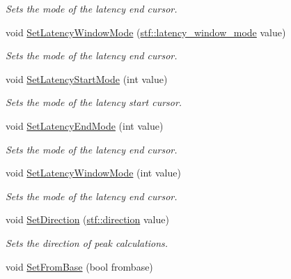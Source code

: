 \begin{DoxyCompactItemize}
\begin{DoxyCompactList}\small\item\em Sets the mode of the latency end cursor. \item\end{DoxyCompactList}\item 
void \hyperlink{classRecording_ae7e27b35fdfe3d0c1333c9b27c50dc8a}{SetLatencyWindowMode} (\hyperlink{group__stfgen_gae034ed0eec6bdaba3b23d3b2184f799d}{stf::latency\_\-window\_\-mode} value)
\begin{DoxyCompactList}\small\item\em Sets the mode of the latency end cursor. \item\end{DoxyCompactList}\item 
void \hyperlink{classRecording_a51fb88318701fd397e8807843fdbef12}{SetLatencyStartMode} (int value)
\begin{DoxyCompactList}\small\item\em Sets the mode of the latency start cursor. \item\end{DoxyCompactList}\item 
void \hyperlink{classRecording_a3c3da2d19c49168626092dadb502eef1}{SetLatencyEndMode} (int value)
\begin{DoxyCompactList}\small\item\em Sets the mode of the latency end cursor. \item\end{DoxyCompactList}\item 
void \hyperlink{classRecording_ab8e835076a514e7bcf572e2f3e1a6163}{SetLatencyWindowMode} (int value)
\begin{DoxyCompactList}\small\item\em Sets the mode of the latency end cursor. \item\end{DoxyCompactList}\item 
void \hyperlink{classRecording_af721941467e53be004e6ca8025828574}{SetDirection} (\hyperlink{group__stfgen_gae8845ae2aeaf4b742a905a2a5571fd5a}{stf::direction} value)
\begin{DoxyCompactList}\small\item\em Sets the direction of peak calculations. \item\end{DoxyCompactList}\item 
void \hyperlink{classRecording_af8f073f1e60d2d589303b3c764c833f6}{SetFromBase} (bool frombase)

\end{DoxyCompactItemize}
